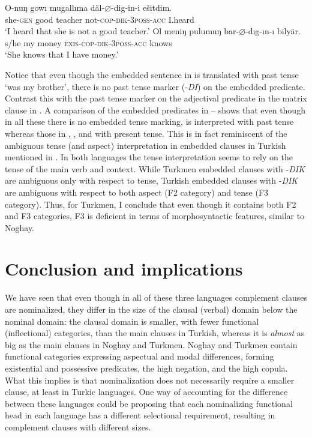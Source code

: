 \documentclass[output=paper]{langsci/langscibook}
\begin{document}
\ea%
    \label{kelepirex:key:25}
    \gll O-nuŋ gowı mugallıma däl-$\varnothing$-dig-in-i ešitdim. \\
    she-\textsc{gen} good teacher       not-\textsc{cop}{}-\textsc{dik{}-3poss-acc} I.heard \\
    \glt `I heard that she is not a good teacher.'
\ex %
    \label{kelepirex:key:26}
    \gll Ol meniŋ pulumuŋ bar-$\varnothing$-dıg-ın-ı bilyär. \\
    s/he my       money    \textsc{exis}{}-\textsc{cop}{}-\textsc{dik{}-3poss-acc}  knows\\
    \glt `She knows that I have money.'
\z

Notice that even though the embedded sentence in  is translated with past tense `was my brother', there is no past tense marker (-\textit{DI}) on the embedded predicate. 
Contrast this with the past tense marker on the adjectival predicate in the matrix clause in . 
A comparison of the embedded predicates in -- shows that even though in all these there is no embedded tense marking,  is interpreted with past tense whereas those in , , and  with present tense. 
This is in fact reminiscent of the ambiguous tense (and aspect) interpretation in embedded clauses in Turkish mentioned in . 
In both languages the tense interpretation seems to rely on the tense of the main verb and context. 
While Turkmen embedded clauses with -\textit{DIK} are ambiguous only with respect to tense, Turkish embedded clauses with -\textit{DIK} are ambiguous with respect to both aspect (F2 category) and tense (F3 category). 
Thus, for Turkmen, I conclude that even though it contains both F2 and F3 categories, F3 is deficient in terms of morphosyntactic features, similar to Noghay.

\section{Conclusion and implications} 
\label{kelepirsec:key:3}
   
We have seen that even though in all of these three languages complement clauses are nominalized, they differ in the size of the clausal (verbal) domain below the nominal domain: 
the clausal domain is smaller, with fewer functional (inflectional) categories, than the main clauses in Turkish, whereas it is \textit{almost} as big as the main clauses in Noghay and Turkmen. 
Noghay and Turkmen contain functional categories expressing aspectual and modal differences, forming existential and possessive predicates, the high negation, and the high copula. 
What this implies is that nominalization does not necessarily require a smaller clause, at least in Turkic languages. 
One way of accounting for the difference between these languages could be proposing that each nominalizing functional head in each language has a different selectional requirement, resulting in complement clauses with different sizes.
\end{document}
